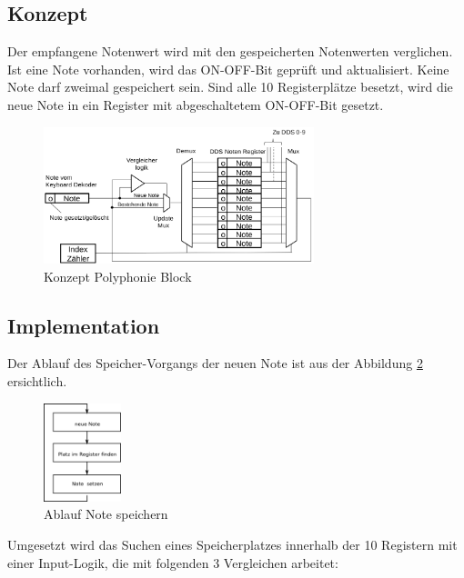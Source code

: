 \subsection{Konzept}\label{konzept_plyphonie}

Der empfangene Notenwert wird mit den gespeicherten Notenwerten verglichen. Ist eine Note vorhanden, wird das ON-OFF-Bit geprüft und aktualisiert. Keine Note darf zweimal gespeichert sein. Sind alle 10 Registerplätze besetzt, wird die neue Note in ein Register mit abgeschaltetem ON-OFF-Bit gesetzt.

\begin{figure}[H]
	\includegraphics[width=0.7\textwidth]{images/midi_interface/Konzept_Hans_polyphonie.png}
	\caption{Konzept Polyphonie Block \citep{konzept_poly} }
	\label{fig.polyphnie_konzept}
\end{figure}

\subsection{Implementation}

Der Ablauf des Speicher-Vorgangs der neuen Note ist aus der Abbildung \ref{fig.polyphnie_ablauf} ersichtlich.

\begin{figure}[H]
	\includegraphics[width=0.2\textwidth]{images/midi_interface/polyphnie_ablauf.png}
	\caption{Ablauf Note speichern }
	\label{fig.polyphnie_ablauf}
\end{figure}

Umgesetzt wird das Suchen eines Speicherplatzes innerhalb der 10 Registern mit einer Input-Logik, die mit folgenden 3 Vergleichen arbeitet:

